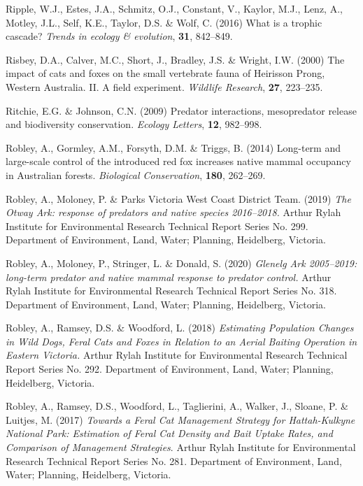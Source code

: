 \documentclass[11pt,a4paper,titlepage,twoside,openright]{style/unimelbthesis}
\begin{document}
\begin{mainmatter}
\leavevmode\hypertarget{ref-ripple2016trophic}{}%
Ripple, W.J., Estes, J.A., Schmitz, O.J., Constant, V., Kaylor, M.J., Lenz, A., Motley, J.L., Self, K.E., Taylor, D.S. \& Wolf, C. (2016) What is a trophic cascade? \emph{Trends in ecology \& evolution}, \textbf{31}, 842--849.

\leavevmode\hypertarget{ref-risbey2000impacts}{}%
Risbey, D.A., Calver, M.C., Short, J., Bradley, J.S. \& Wright, I.W. (2000) The impact of cats and foxes on the small vertebrate fauna of Heirisson Prong, Western Australia. II. A field experiment. \emph{Wildlife Research}, \textbf{27}, 223--235.

\leavevmode\hypertarget{ref-ritchie2009predator}{}%
Ritchie, E.G. \& Johnson, C.N. (2009) Predator interactions, mesopredator release and biodiversity conservation. \emph{Ecology Letters}, \textbf{12}, 982--998.

\leavevmode\hypertarget{ref-robley2014long}{}%
Robley, A., Gormley, A.M., Forsyth, D.M. \& Triggs, B. (2014) Long-term and large-scale control of the introduced red fox increases native mammal occupancy in Australian forests. \emph{Biological Conservation}, \textbf{180}, 262--269.

\leavevmode\hypertarget{ref-robley2019otway}{}%
Robley, A., Moloney, P. \& Parks Victoria West Coast District Team. (2019) \emph{The Otway Ark: response of predators and native species 2016--2018.} Arthur Rylah Institute for Environmental Research Technical Report Series No. 299. Department of Environment, Land, Water; Planning, Heidelberg, Victoria.

\leavevmode\hypertarget{ref-robley2020glenelg}{}%
Robley, A., Moloney, P., Stringer, L. \& Donald, S. (2020) \emph{Glenelg Ark 2005--2019: long-term predator and native mammal response to predator control.} Arthur Rylah Institute for Environmental Research Technical Report Series No. 318. Department of Environment, Land, Water; Planning, Heidelberg, Victoria.

\leavevmode\hypertarget{ref-robley2018estimating}{}%
Robley, A., Ramsey, D.S. \& Woodford, L. (2018) \emph{Estimating Population Changes in Wild Dogs, Feral Cats and Foxes in Relation to an Aerial Baiting Operation in Eastern Victoria.} Arthur Rylah Institute for Environmental Research Technical Report Series No. 292. Department of Environment, Land, Water; Planning, Heidelberg, Victoria.

\leavevmode\hypertarget{ref-robley2017towards}{}%
Robley, A., Ramsey, D.S., Woodford, L., Taglierini, A., Walker, J., Sloane, P. \& Luitjes, M. (2017) \emph{Towards a Feral Cat Management Strategy for Hattah-Kulkyne National Park: Estimation of Feral Cat Density and Bait Uptake Rates, and Comparison of Management Strategies}. Arthur Rylah Institute for Environmental Research Technical Report Series No. 281. Department of Environment, Land, Water; Planning, Heidelberg, Victoria.


\end{mainmatter}
\end{document}
